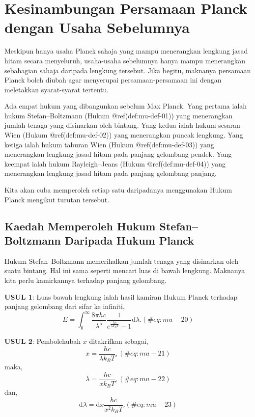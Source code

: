 \documentclass[
]{book}
\begin{document}
\hypertarget{sec:kesinambungan}{%
\section{Kesinambungan Persamaan Planck dengan Usaha
Sebelumnya}\label{sec:kesinambungan}}

Meskipun hanya usaha Planck sahaja yang mampu menerangkan lengkung jasad
hitam secara menyeluruh, usaha-usaha sebelumnya hanya mampu menerangkan
sebahagian sahaja daripada lengkung tersebut. Jika begitu, maknanya
persamaan Planck boleh diubah agar menyerupai persamaan-persamaan ini
dengan meletakkan syarat-syarat tertentu.

Ada empat hukum yang dibangunkan sebelum Max Planck. Yang pertama ialah
hukum Stefan--Boltzmann (Hukum @ref(def:mu-def-01)) yang menerangkan
jumlah tenaga yang disinarkan oleh bintang. Yang kedua ialah hukum
sesaran Wien (Hukum @ref(def:mu-def-02)) yang menerangkan puncak
lengkung. Yang ketiga ialah hukum taburan Wien (Hukum
@ref(def:mu-def-03)) yang menerangkan lengkung jasad hitam pada panjang
gelombang pendek. Yang keempat ialah hukum Rayleigh--Jeans (Hukum
@ref(def:mu-def-04)) yang menerangkan lengkung jasad hitam pada panjang
gelombang panjang.

Kita akan cuba memperoleh setiap satu daripadanya menggunakan Hukum
Planck mengikut turutan tersebut.

\hypertarget{sec:planck-stefan-boltzmann}{%
\subsection{Kaedah Memperoleh Hukum Stefan--Boltzmann Daripada Hukum
Planck}\label{sec:planck-stefan-boltzmann}}

Hukum Stefan--Boltzmann memerihalkan jumlah tenaga yang disinarkan oleh
suatu bintang. Hal ini sama seperti mencari luas di bawah lengkung.
Maknanya kita perlu kamirkannya terhadap panjang gelombang.

\textbf{USUL 1}: Luas bawah lengkung ialah hasil kamiran Hukum Planck
terhadap panjang gelombang dari sifar ke infiniti, \begin{equation}
E = \int_0^\infty \frac{8\pi hc}{\lambda^5}\frac{1}{e^{\frac{hc}{\lambda k_BT}}-1} \text{d}\lambda.
(\#eq:mu-20)
\end{equation}

\textbf{USUL 2}: Pembolehubah \(x\) ditakrifkan sebagai,
\begin{equation}
x = \frac{hc}{\lambda k_BT},
(\#eq:mu-21)
\end{equation} maka, \begin{equation}
\lambda = \frac{hc}{xk_BT},
(\#eq:mu-22)
\end{equation} dan, \begin{equation}
\text{d}\lambda = \text{d}x \frac{hc}{x^2k_BT}.
(\#eq:mu-23)
\end{equation}
\end{document}
